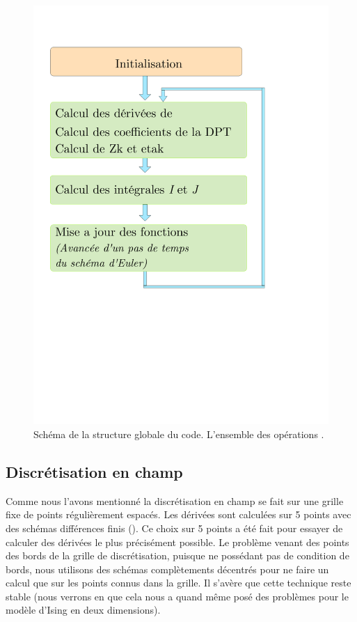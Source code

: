 \documentclass[10pt]{article}
\begin{document}
\begin{multicols}{2}
\begin{figure}[H]
	\begin{center}
		\includegraphics[scale = 0.7]{Diagramme_Code.pdf}
		\caption{Schéma de la structure globale du code. L'ensemble des opérations .}
		\label{figPhoto1}
	\end{center}
\end{figure}


\subsection{Discrétisation en champ}

Comme nous l'avons mentionné la discrétisation en champ se fait sur une grille fixe de points régulièrement espacés. Les dérivées sont calculées sur 5 points avec des schémas différences finis (). Ce choix sur 5 points  a été fait pour essayer de calculer des dérivées le plus précisément possible. Le problème venant des points des bords de la grille de discrétisation, puisque ne possédant pas de condition de bords, nous utilisons des schémas complètements décentrés pour ne faire un calcul que sur les points connus dans la grille. Il s'avère que cette technique reste stable (nous verrons en  que cela nous a quand même posé des problèmes pour le modèle d'Ising en deux dimensions). 


\end{multicols}
\end{document}
